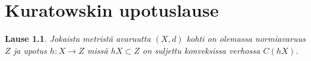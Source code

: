 \documentclass[12pt,a4paper,leqno]{report}
\newcommand{\N}{\mathbb{N}}
\theoremstyle{plain}
\newtheorem{lause}[equation]{Lause}
\theoremstyle{definition}
\newtheorem{maar}[equation]{Määritelmä}
\theoremstyle{remark}
\begin{document}


%
%
%
%
%
%


\chapter{Kuratowskin upotuslause}\label{kuratowski}

\begin{lause}
Jokaista metristä avaruutta $(X,d)$ kohti on olemassa normiavaruus $Z$ ja upotus $h\colon X\rightarrow Z$ missä $ hX\subset Z$ on suljettu konveksissa verhossa $C(hX)$. 
\end{lause} 
 
\end{document}
